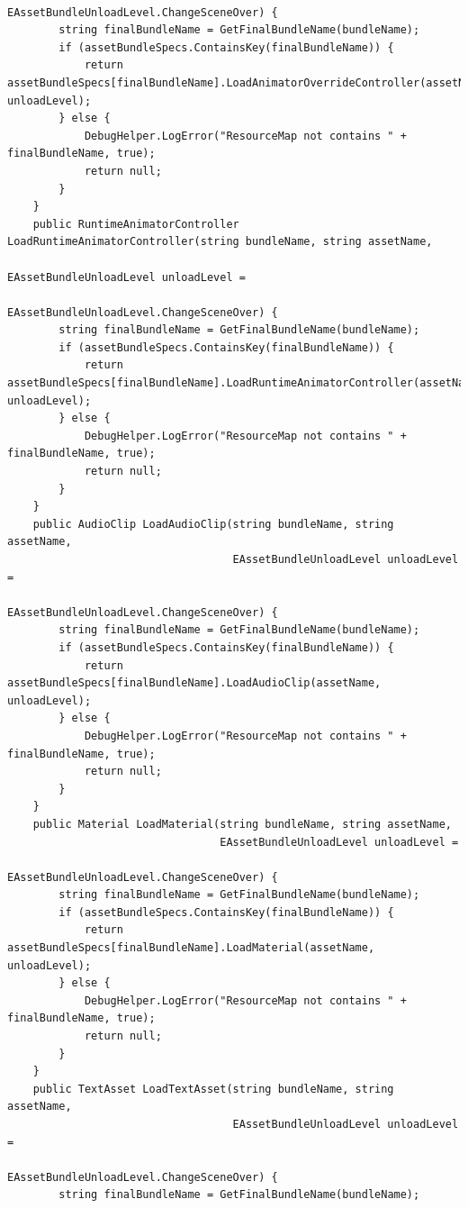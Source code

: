 \documentclass[9pt, b5paper]{article}
\begin{document}
\begin{verbatim}
                                                                     EAssetBundleUnloadLevel.ChangeSceneOver) {
        string finalBundleName = GetFinalBundleName(bundleName);
        if (assetBundleSpecs.ContainsKey(finalBundleName)) {
            return assetBundleSpecs[finalBundleName].LoadAnimatorOverrideController(assetName, unloadLevel);
        } else {
            DebugHelper.LogError("ResourceMap not contains " + finalBundleName, true);
            return null;
        }
    }
    public RuntimeAnimatorController LoadRuntimeAnimatorController(string bundleName, string assetName, 
                                                                   EAssetBundleUnloadLevel unloadLevel = 
                                                                   EAssetBundleUnloadLevel.ChangeSceneOver) {
        string finalBundleName = GetFinalBundleName(bundleName);
        if (assetBundleSpecs.ContainsKey(finalBundleName)) {
            return assetBundleSpecs[finalBundleName].LoadRuntimeAnimatorController(assetName, unloadLevel);
        } else {
            DebugHelper.LogError("ResourceMap not contains " + finalBundleName, true);
            return null;
        }
    }
    public AudioClip LoadAudioClip(string bundleName, string assetName, 
                                   EAssetBundleUnloadLevel unloadLevel = 
                                   EAssetBundleUnloadLevel.ChangeSceneOver) {
        string finalBundleName = GetFinalBundleName(bundleName);
        if (assetBundleSpecs.ContainsKey(finalBundleName)) {
            return assetBundleSpecs[finalBundleName].LoadAudioClip(assetName, unloadLevel);
        } else {
            DebugHelper.LogError("ResourceMap not contains " + finalBundleName, true);
            return null;
        }
    }
    public Material LoadMaterial(string bundleName, string assetName, 
                                 EAssetBundleUnloadLevel unloadLevel = 
                                 EAssetBundleUnloadLevel.ChangeSceneOver) {
        string finalBundleName = GetFinalBundleName(bundleName);
        if (assetBundleSpecs.ContainsKey(finalBundleName)) {
            return assetBundleSpecs[finalBundleName].LoadMaterial(assetName, unloadLevel);
        } else {
            DebugHelper.LogError("ResourceMap not contains " + finalBundleName, true);
            return null;
        }
    }
    public TextAsset LoadTextAsset(string bundleName, string assetName, 
                                   EAssetBundleUnloadLevel unloadLevel = 
                                   EAssetBundleUnloadLevel.ChangeSceneOver) {
        string finalBundleName = GetFinalBundleName(bundleName);

\end{verbatim}
\end{document}
